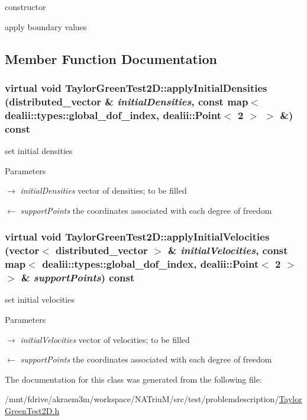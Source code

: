 constructor 

apply boundary values 

\subsection{Member Function Documentation}
\hypertarget{classTaylorGreenTest2D_afb1eb7785fdf13833f322312e5552c4d}{
\subsubsection[{applyInitialDensities}]{\setlength{\rightskip}{0pt plus 5cm}virtual void TaylorGreenTest2D::applyInitialDensities (distributed\_\-vector \& {\em initialDensities}, \/  const map$<$ dealii::types::global\_\-dof\_\-index, dealii::Point$<$ 2 $>$ $>$ \&) const}}
\label{classTaylorGreenTest2D_afb1eb7785fdf13833f322312e5552c4d}


set initial densities 
\begin{DoxyParams}{Parameters}
\item[\mbox{$\rightarrow$} {\em initialDensities}]vector of densities; to be filled \item[\mbox{$\leftarrow$} {\em supportPoints}]the coordinates associated with each degree of freedom \end{DoxyParams}
\hypertarget{classTaylorGreenTest2D_a24c05ac74d000754f0caf03653bdf793}{
\subsubsection[{applyInitialVelocities}]{\setlength{\rightskip}{0pt plus 5cm}virtual void TaylorGreenTest2D::applyInitialVelocities (vector$<$ distributed\_\-vector $>$ \& {\em initialVelocities}, \/  const map$<$ dealii::types::global\_\-dof\_\-index, dealii::Point$<$ 2 $>$ $>$ \& {\em supportPoints}) const}}
\label{classTaylorGreenTest2D_a24c05ac74d000754f0caf03653bdf793}


set initial velocities 
\begin{DoxyParams}{Parameters}
\item[\mbox{$\rightarrow$} {\em initialVelocities}]vector of velocities; to be filled \item[\mbox{$\leftarrow$} {\em supportPoints}]the coordinates associated with each degree of freedom \end{DoxyParams}


The documentation for this class was generated from the following file:\begin{DoxyCompactItemize}
\item 
/mnt/fdrive/akraem3m/workspace/NATriuM/src/test/problemdescription/\hyperlink{TaylorGreenTest2D_8h}{TaylorGreenTest2D.h}\end{DoxyCompactItemize}
